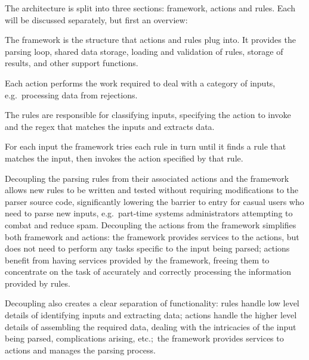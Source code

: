\documentclass{svmult}
\begin{document}
\label{Architecture}

The architecture is split into three sections: framework, actions and
rules.  Each will be discussed separately, but first an overview:

\begin{description}[Framework]

    \item [Framework]  The framework is the structure that actions and
        rules plug into.  It provides the parsing loop, shared data
        storage, loading and validation of rules, storage of results, and
        other support functions.

    \item [Actions]  Each action performs the work required to deal with a
        category of inputs, e.g.\ processing data from rejections.

    \item [Rules]  The rules are responsible for classifying
        inputs, specifying the action to invoke and the regex that matches
        the inputs and extracts data.

\end{description}

For each input the framework tries each rule in turn until it finds a rule
that matches the input, then invokes the action specified by that rule.

Decoupling the parsing rules from their associated actions and the
framework allows new rules to be written and tested without requiring
modifications to the parser source code, significantly lowering the barrier
to entry for casual users who need to parse new inputs, e.g.\ part-time
systems administrators attempting to combat and reduce spam.  Decoupling
the actions from the framework simplifies both framework and actions: the
framework provides services to the actions, but does not need to perform
any tasks specific to the input being parsed; actions benefit from having
services provided by the framework, freeing them to concentrate on the task
of accurately and correctly processing the information provided by rules.

Decoupling also creates a clear separation of functionality: rules handle
low level details of identifying inputs and extracting data; actions handle
the higher level details of assembling the required data, dealing with the
intricacies of the input being parsed, complications arising, etc.;\ the
framework provides services to actions and manages the parsing process.
\end{document}

